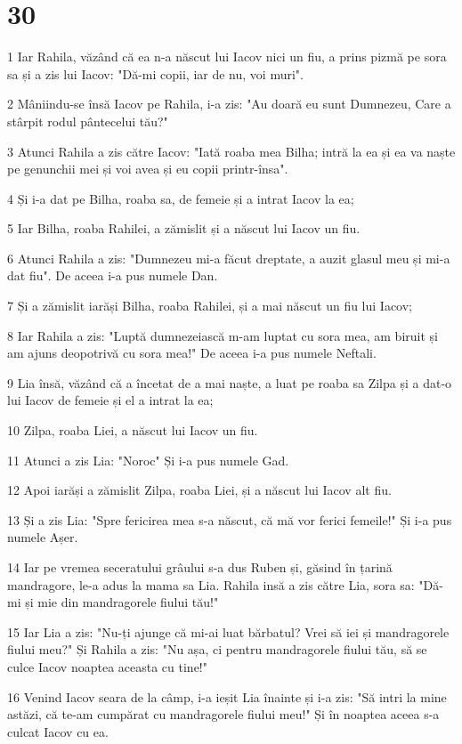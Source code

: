 \chapter{30}

\par 1 Iar Rahila, văzând că ea n-a născut lui Iacov nici un fiu, a prins pizmă pe sora sa și a zis lui Iacov: "Dă-mi copii, iar de nu, voi muri".
\par 2 Mâniindu-se însă Iacov pe Rahila, i-a zis: "Au doară eu sunt Dumnezeu, Care a stârpit rodul pântecelui tău?"
\par 3 Atunci Rahila a zis către Iacov: "Iată roaba mea Bilha; intră la ea și ea va naște pe genunchii mei și voi avea și eu copii printr-însa".
\par 4 Și i-a dat pe Bilha, roaba sa, de femeie și a intrat Iacov la ea;
\par 5 Iar Bilha, roaba Rahilei, a zămislit și a născut lui Iacov un fiu.
\par 6 Atunci Rahila a zis: "Dumnezeu mi-a făcut dreptate, a auzit glasul meu și mi-a dat fiu". De aceea i-a pus numele Dan.
\par 7 Și a zămislit iarăși Bilha, roaba Rahilei, și a mai născut un fiu lui Iacov;
\par 8 Iar Rahila a zis: "Luptă dumnezeiască m-am luptat cu sora mea, am biruit și am ajuns deopotrivă cu sora mea!" De aceea i-a pus numele Neftali.
\par 9 Lia însă, văzând că a încetat de a mai naște, a luat pe roaba sa Zilpa și a dat-o lui Iacov de femeie și el a intrat la ea;
\par 10 Zilpa, roaba Liei, a născut lui Iacov un fiu.
\par 11 Atunci a zis Lia: "Noroc" Și i-a pus numele Gad.
\par 12 Apoi iarăși a zămislit Zilpa, roaba Liei, și a născut lui Iacov alt fiu.
\par 13 Și a zis Lia: "Spre fericirea mea s-a născut, că mă vor ferici femeile!" Și i-a pus numele Așer.
\par 14 Iar pe vremea seceratului grâului s-a dus Ruben și, găsind în țarină mandragore, le-a adus la mama sa Lia. Rahila insă a zis către Lia, sora sa: "Dă-mi și mie din mandragorele fiului tău!"
\par 15 Iar Lia a zis: "Nu-ți ajunge că mi-ai luat bărbatul? Vrei să iei și mandragorele fiului meu?" Și Rahila a zis: "Nu așa, ci pentru mandragorele fiului tău, să se culce Iacov noaptea aceasta cu tine!"
\par 16 Venind Iacov seara de la câmp, i-a ieșit Lia înainte și i-a zis: "Să intri la mine astăzi, că te-am cumpărat cu mandragorele fiului meu!" Și în noaptea aceea s-a culcat Iacov cu ea.
